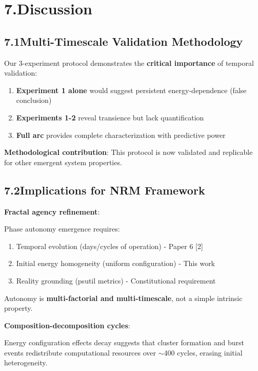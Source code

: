 \documentclass[11pt]{article}
\begin{document}
\section*{7.\quad Discussion}

\subsection*{7.1\quad Multi-Timescale Validation Methodology}

Our 3-experiment protocol demonstrates the \textbf{critical importance} of temporal validation:

\begin{enumerate}
    \item \textbf{Experiment 1 alone} would suggest persistent energy-dependence (false conclusion)
    \item \textbf{Experiments 1-2} reveal transience but lack quantification
    \item \textbf{Full arc} provides complete characterization with predictive power
\end{enumerate}

\noindent\textbf{Methodological contribution}: This protocol is now validated and replicable for other emergent system properties.

\subsection*{7.2\quad Implications for NRM Framework}

\noindent\textbf{Fractal agency refinement}:

Phase autonomy emergence requires:
\begin{enumerate}
    \item Temporal evolution (days/cycles of operation) - Paper 6 [2]
    \item Initial energy homogeneity (uniform configuration) - This work
    \item Reality grounding (psutil metrics) - Constitutional requirement
\end{enumerate}

Autonomy is \textbf{multi-factorial and multi-timescale}, not a simple intrinsic property.

\noindent\textbf{Composition-decomposition cycles}:

Energy configuration effects decay suggests that cluster formation and burst events redistribute computational resources over $\sim$400 cycles, erasing initial heterogeneity.
\end{document}
